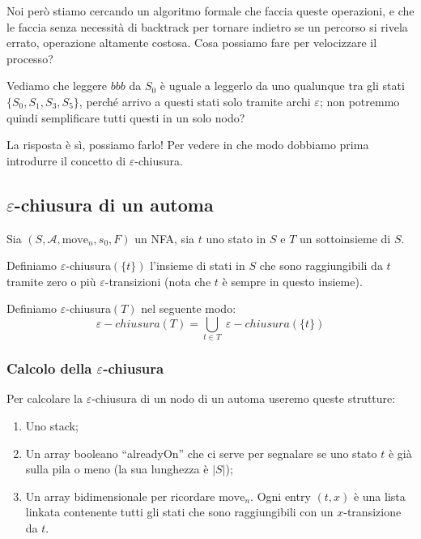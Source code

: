 \documentclass[class=book, crop=false, oneside, 12pt]{standalone}
\begin{document}
Noi però stiamo cercando un algoritmo formale che faccia queste operazioni, e che le faccia senza necessità di backtrack per tornare indietro se un percorso si rivela errato, operazione altamente costosa.
Cosa possiamo fare per velocizzare il processo?

Vediamo che leggere \(bbb\) da \(S_0\) è uguale a leggerlo da uno qualunque tra gli stati \(\{S_0, S_1, S_3, S_5\}\), perché arrivo a questi stati solo tramite archi \(\varepsilon\); non potremmo quindi semplificare tutti questi in un solo nodo?

La risposta è sì, possiamo farlo! Per vedere in che modo dobbiamo prima introdurre il concetto di \(\varepsilon\)-chiusura.


\subsection{\(\varepsilon\)-chiusura di un automa}
Sia \((S, \mathcal{A}, \textrm{move}_n, s_0, F)\) un NFA, sia \(t\) uno stato in \(S\) e \(T\) un sottoinsieme di \(S\).

Definiamo \(\varepsilon\)-chiusura\((\{t\})\) l’insieme di stati in \(S\) che sono raggiungibili da \(t\) tramite zero o più \(\varepsilon\)-transizioni (nota che \(t\) è sempre in questo insieme).

Definiamo \(\varepsilon\)-chiusura\((T)\) nel seguente modo:
\begin{equation}
    \varepsilon-chiusura(T) = \bigcup_{t \in T} \;\varepsilon-chiusura(\{t\})
\end{equation} 

\subsubsection{Calcolo della \(\varepsilon\)-chiusura}
Per calcolare la \(\varepsilon\)-chiusura di un nodo di un automa useremo queste strutture:

\begin{enumerate}
    \item Uno stack;
    \item Un array booleano “alreadyOn” che ci serve per segnalare se uno stato \(t\) è già sulla pila o meno (la sua lunghezza è \(|S|\));
    \item Un array bidimensionale per ricordare \(\textrm{move}_n\). Ogni entry \((t,x)\) è una lista linkata contenente tutti gli stati che sono raggiungibili con un \(x\)-transizione da \(t\).
\end{enumerate}
\end{document}
